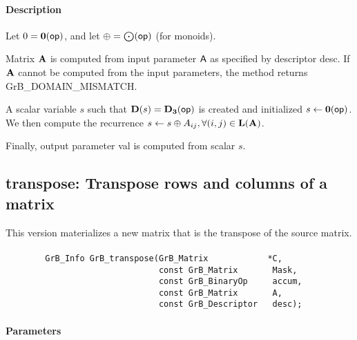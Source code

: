 \paragraph{Description}


Let $0 = \bold{0}({\sf op})$, and let $\oplus = \bigodot({\sf op})$ (for monoids).

Matrix ${\bf A}$ is computed from input parameter ${\sf A}$ as
specified by descriptor {\sf desc}. If ${\bf A}$ cannot be computed
from the input parameters, the method returns {\sf GrB\_DOMAIN\_MISMATCH}.

A scalar variable $s$ such that $\bold{D}(s) = \bold{D_3}({\sf op})$ is
created and initialized $s \leftarrow \bold{0}({\sf op})$. 
We then compute the recurrence $s \leftarrow s \oplus A_{ij}, \forall (i, j) \in \bold{L}({\bf A})$.

Finally, output parameter {\sf val} is computed from scalar $s$.


\subsection{{\sf transpose}: Transpose rows and columns of a matrix}

This version materializes a new matrix that is the transpose of the source matrix.


\paragraph{\syntax}

\begin{verbatim}
        GrB_Info GrB_transpose(GrB_Matrix            *C,
                               const GrB_Matrix       Mask,
                               const GrB_BinaryOp     accum,
                               const GrB_Matrix       A,
                               const GrB_Descriptor   desc);
\end{verbatim}

\paragraph{Parameters}

